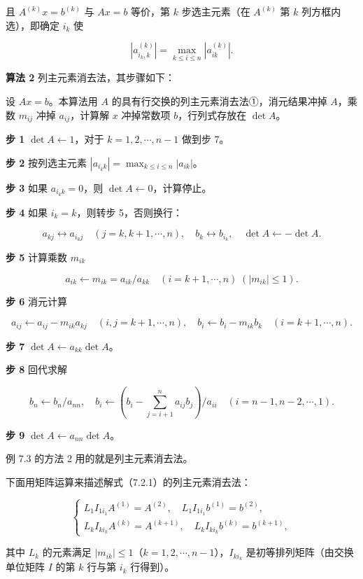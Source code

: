 \documentclass[
  10pt,
  fontset=fandol]{ctexart}
\begin{document}
且 \(A^{(k)}x=b^{(k)}\) 与 \(Ax=b\) 等价，第 \(k\) 步选主元素（在 \(A^{(k)}\) 第 \(k\) 列方框内选），即确定 \(i_k\) 使

\[|a_{i_k,k}^{(k)}|=\max_{k\le i\le n}|a_{ik}^{(k)}|.\]

\textbf{算法 2} 列主元素消去法，其步骤如下：

设 \(Ax=b\)。本算法用 \(A\) 的具有行交换的列主元素消去法①，消元结果冲掉 \(A\)，乘数 \(m_{ij}\) 冲掉 \(a_{ij}\)，计算解 \(x\) 冲掉常数项 \(b\)，行列式存放在 \(\det A\)。

\textbf{步 1} \(\det A\leftarrow1\)，对于 \(k=1,2,\cdots,n-1\) 做到步 7。

\textbf{步 2} 按列选主元素 \(|a_{i_kk}|=\max_{k\le i\le n}|a_{ik}|\)。

\textbf{步 3} 如果 \(a_{i_kk}=0\)，则 \(\det A\leftarrow0\)，计算停止。

\textbf{步 4} 如果 \(i_k=k\)，则转步 5，否则换行：

\[a_{kj}\leftrightarrow a_{i_kj}\quad(j=k,k+1,\cdots,n),\quad b_k\leftrightarrow b_{i_k},\quad \det A\leftarrow-\det A.\]

\textbf{步 5} 计算乘数 \(m_{ik}\)

\[a_{ik}\leftarrow m_{ik}=a_{ik}/a_{kk}\quad(i=k+1,\cdots,n)\;(|m_{ik}|\le1).\]

\textbf{步 6} 消元计算

\[a_{ij}\leftarrow a_{ij}-m_{ik}a_{kj}\quad(i,j=k+1,\cdots,n),\quad b_i\leftarrow b_i-m_{ik}b_k\quad(i=k+1,\cdots,n).\]

\textbf{步 7} \(\det A\leftarrow a_{kk}\det A\)。

\textbf{步 8} 回代求解

\[b_n\leftarrow b_n/a_{nn},\quad b_i\leftarrow\left(b_i-\sum_{j=i+1}^{n}a_{ij}b_j\right)/a_{ii}\quad(i=n-1,n-2,\cdots,1).\]

\textbf{步 9} \(\det A\leftarrow a_{nn}\det A\)。

例 7.3 的方法 2 用的就是列主元素消去法。

下面用矩阵运算来描述解式（7.2.1）的列主元素消去法：

\[
\begin{cases}
L_1I_{1i_1}A^{(1)}=A^{(2)},\quad L_1I_{1i_1}b^{(1)}=b^{(2)},\\
L_kI_{ki_k}A^{(k)}=A^{(k+1)},\quad L_kI_{ki_k}b^{(k)}=b^{(k+1)},
\end{cases}
\tag{7.3.1}
\]

其中 \(L_k\) 的元素满足 \(|m_{ik}|\le1\)（\(k=1,2,\cdots,n-1\)），\(I_{ki_k}\) 是初等排列矩阵（由交换单位矩阵 \(I\) 的第 \(k\) 行与第 \(i_k\) 行得到）。
\end{document}
